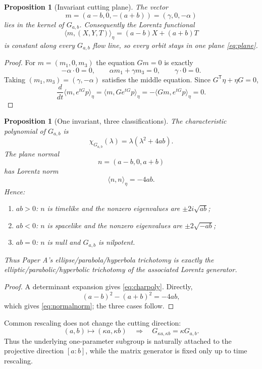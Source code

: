 \documentclass[11pt]{amsart}
\newtheorem{proposition}[theorem]{Proposition}
\theoremstyle{remark}
\begin{document}
\begin{proposition}[Invariant cutting plane]\label{prop:invariant}
The vector
\[
m=(a-b,0,-(a+b))=(\gamma,0,-\alpha)
\]
lies in the kernel of $G_{a,b}$.  Consequently the Lorentz functional
\[
\langle m,(X,Y,T)\rangle_\eta
=(a-b)X+(a+b)T
\]
is constant along every $G_{a,b}$ flow line, so every orbit stays in one plane \eqref{eq:plane}.
\end{proposition}

\begin{proof}
For $m=(m_1,0,m_3)$ the equation $Gm=0$ is exactly
\[
-\alpha\cdot0=0,
\qquad
\alpha m_1+\gamma m_3=0,
\qquad
\gamma\cdot0=0.
\]
Taking $(m_1,m_3)=(\gamma,-\alpha)$ satisfies the middle equation.  Since $G^{\mathsf T}\eta+\eta G=0$,
\[
\frac{d}{dt}\langle m,e^{tG}p\rangle_\eta
=\langle m,Ge^{tG}p\rangle_\eta
=-\langle Gm,e^{tG}p\rangle_\eta=0.
\]
\end{proof}

\begin{proposition}[One invariant, three classifications]\label{prop:classification}
The characteristic polynomial of $G_{a,b}$ is
\begin{equation}\label{eq:charpoly}
\boxed{\chi_{G_{a,b}}(\lambda)=\lambda(\lambda^2+4ab).}
\end{equation}
The plane normal
\[
n=(a-b,0,a+b)
\]
has Lorentz norm
\begin{equation}\label{eq:normalnorm}
\boxed{\langle n,n\rangle_\eta=-4ab.}
\end{equation}
Hence:
\begin{enumerate}[label=(\roman*)]
\item $ab>0$: $n$ is timelike and the nonzero eigenvalues are $\pm2i\sqrt{ab}$;
\item $ab<0$: $n$ is spacelike and the nonzero eigenvalues are $\pm2\sqrt{-ab}$;
\item $ab=0$: $n$ is null and $G_{a,b}$ is nilpotent.
\end{enumerate}
Thus Paper A's ellipse/parabola/hyperbola trichotomy is exactly the elliptic/parabolic/hyperbolic trichotomy of the associated Lorentz generator.
\end{proposition}

\begin{proof}
A determinant expansion gives \eqref{eq:charpoly}.  Directly,
\[
(a-b)^2-(a+b)^2=-4ab,
\]
which gives \eqref{eq:normalnorm}; the three cases follow.
\end{proof}

Common rescaling does not change the cutting direction:
\[
(a,b)\mapsto(\kappa a,\kappa b)
\quad\Longrightarrow\quad
G_{\kappa a,\kappa b}=\kappa G_{a,b}.
\]
Thus the underlying one-parameter subgroup is naturally attached to the projective direction $[a:b]$, while the matrix generator is fixed only up to time rescaling.
\end{document}
